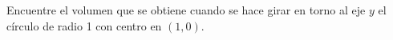 \item Encuentre el volumen que se obtiene cuando se hace girar en torno al eje $y$ el círculo de radio 1 con centro en $(1, 0)$.
